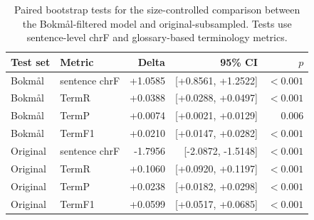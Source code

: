 \documentclass[11pt]{article}
\newcommand{\nb}{Bokm{\aa}l}
\begin{document}
\begin{table}[h]
\centering
\small
\begin{tabular}{llrrr}
\toprule
Test set & Metric & Delta & 95\% CI & $p$ \\
\midrule
\nb{} & sentence chrF & +1.0585 & [+0.8561, +1.2522] & $<0.001$ \\
\nb{} & TermR & +0.0388 & [+0.0288, +0.0497] & $<0.001$ \\
\nb{} & TermP & +0.0074 & [+0.0021, +0.0129] & 0.006 \\
\nb{} & TermF1 & +0.0210 & [+0.0147, +0.0282] & $<0.001$ \\
Original & sentence chrF & -1.7956 & [-2.0872, -1.5148] & $<0.001$ \\
Original & TermR & +0.1060 & [+0.0920, +0.1197] & $<0.001$ \\
Original & TermP & +0.0238 & [+0.0182, +0.0298] & $<0.001$ \\
Original & TermF1 & +0.0599 & [+0.0517, +0.0685] & $<0.001$ \\
\bottomrule
\end{tabular}
\caption{Paired bootstrap tests for the size-controlled comparison between the \nb{}-filtered model and original-subsampled. Tests use sentence-level chrF and glossary-based terminology metrics.}
\label{tab:significance-tests}
\end{table}
\end{document}
